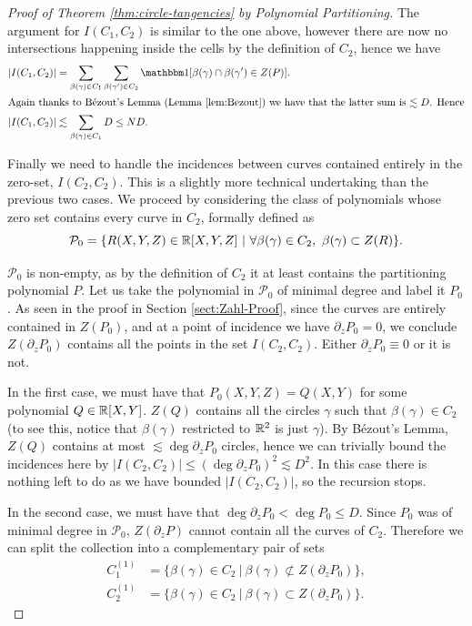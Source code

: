 \begin{proof}[Proof of Theorem \ref{thm:circle-tangencies} by Polynomial Partitioning]
The argument for $I(C_1,C_2)$ is similar to the one above, however there are now no intersections happening inside the cells by the definition of $C_2$, hence we have
\begin{align*}
    |I(C_1,C_2)| &= \sum_{\beta(\gamma)\in C_1} \sum_{\beta(\gamma') \in C_2} \OO[\beta(\gamma) \cap \beta(\gamma') \in Z(P)]. \\
    \intertext{Again thanks to Bézout's Lemma (Lemma \ref{lem:Bezout}) we have that the latter sum is $\lesssim D$. Hence}
    |I(C_1,C_2)|& \lesssim \sum_{\beta(\gamma)\in C_1} D \leq ND.
\end{align*}

Finally we need to handle the incidences between curves contained entirely in the zero-set, $I(C_2,C_2)$.
This is a slightly more technical undertaking than the previous two cases.
We proceed by considering the class of polynomials whose zero set contains every curve in $C_2$, formally defined as
\[
    \mathcal P_0 = \{  R(X,Y,Z) \in \RR[X,Y,Z] \ | \ \forall \beta(\gamma) \in C_2, \ \beta(\gamma) \subset Z(R) \}.  
\]

$\mathcal P_0$ is non-empty, as by the definition of $C_2$ it at least contains the partitioning polynomial $P$. Let us take the polynomial in $\mathcal P_0$ of minimal degree and label it $P_0$. 
As seen in the proof in Section \ref{sect:Zahl-Proof}, since the curves are entirely contained in $Z(P_0)$, and at a point of incidence we have $\partial_z P_0 =0$, we conclude $Z(\partial_z P_0)$ contains all the points in the set $I(C_2,C_2)$.  Either $\partial_z P_0 \equiv 0$ or it is not. 

In the first case, we must have that $P_0(X,Y,Z) = Q(X,Y)$ for some polynomial $Q \in \mathbb R[X,Y]$. 
$Z(Q)$ contains all the circles $\gamma$ such that $\beta (\gamma) \in C_2$ (to see this, notice that $\beta(\gamma)$ restricted to $\mathbb R^2$ is just $\gamma$). 
By Bézout's Lemma, $Z(Q)$ contains at most $\lesssim \deg \partial_z P_0$ circles, hence we can trivially bound the incidences here by $|I(C_2,C_2)| \leq (\deg \partial_z P_0 )^2 \lesssim D^2$.
In this case there is nothing left to do as we have bounded $|I(C_2, C_2)|$, so the recursion stops.

In the second case, we must have that $ \deg \partial_z P_0 < \deg P_0 \leq D$. Since $P_0$ was of minimal degree in $\mathcal P_0$, $Z(\partial_z P)$ cannot contain all the curves of $C_2$.
Therefore we can split the collection into a complementary pair of sets  
\begin{align*}
    C_1^{(1)} &= \{ \beta(\gamma) \in C_2 \ | \  \beta(\gamma) \not \subset Z(\partial_z P_0)  \}, \\
    C_2^{(1)} &=  \{ \beta(\gamma) \in C_2 \ | \  \beta(\gamma) \subset Z(\partial_z P_0)  \}.
\end{align*}


\end{proof}
